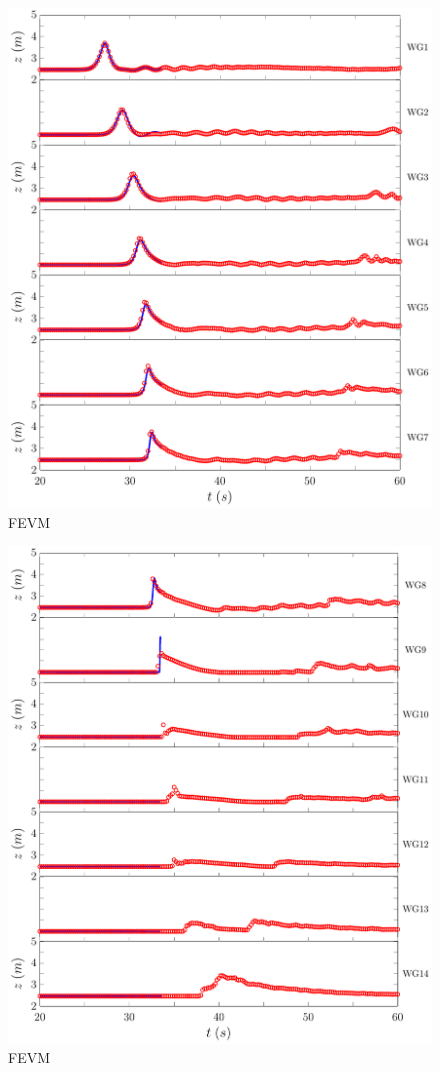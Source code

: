 \begin{figure}
	\centering
	\includegraphics[width=\textwidth]{./chp6/figures/Experiment/Roeber/Trial8/FDVM/LongWGs1.pdf}
	\caption{FEVM}
	\label{fig:Roeber8WG1to7FDVM}
\end{figure}
\begin{figure}
	\centering
	\includegraphics[width=\textwidth]{./chp6/figures/Experiment/Roeber/Trial8/FDVM/LongWGs2.pdf}
	\caption{FEVM}
	\label{fig:Roeber8WG7to14FDVM}
\end{figure} 
